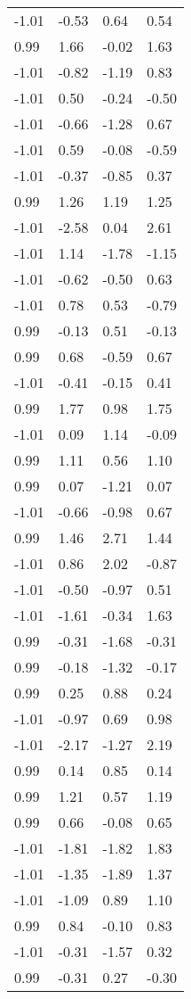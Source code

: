 \documentclass[
  doc,draftall]{apa6}
\begin{document}
\begin{table}[tbp]
\begin{center}
\begin{threeparttable}
\begin{tabular}{llll}
-1.01 & -0.53 & 0.64 & 0.54\\
0.99 & 1.66 & -0.02 & 1.63\\
-1.01 & -0.82 & -1.19 & 0.83\\
-1.01 & 0.50 & -0.24 & -0.50\\
-1.01 & -0.66 & -1.28 & 0.67\\
-1.01 & 0.59 & -0.08 & -0.59\\
-1.01 & -0.37 & -0.85 & 0.37\\
0.99 & 1.26 & 1.19 & 1.25\\
-1.01 & -2.58 & 0.04 & 2.61\\
-1.01 & 1.14 & -1.78 & -1.15\\
-1.01 & -0.62 & -0.50 & 0.63\\
-1.01 & 0.78 & 0.53 & -0.79\\
0.99 & -0.13 & 0.51 & -0.13\\
0.99 & 0.68 & -0.59 & 0.67\\
-1.01 & -0.41 & -0.15 & 0.41\\
0.99 & 1.77 & 0.98 & 1.75\\
-1.01 & 0.09 & 1.14 & -0.09\\
0.99 & 1.11 & 0.56 & 1.10\\
0.99 & 0.07 & -1.21 & 0.07\\
-1.01 & -0.66 & -0.98 & 0.67\\
0.99 & 1.46 & 2.71 & 1.44\\
-1.01 & 0.86 & 2.02 & -0.87\\
-1.01 & -0.50 & -0.97 & 0.51\\
-1.01 & -1.61 & -0.34 & 1.63\\
0.99 & -0.31 & -1.68 & -0.31\\
0.99 & -0.18 & -1.32 & -0.17\\
0.99 & 0.25 & 0.88 & 0.24\\
-1.01 & -0.97 & 0.69 & 0.98\\
-1.01 & -2.17 & -1.27 & 2.19\\
0.99 & 0.14 & 0.85 & 0.14\\
0.99 & 1.21 & 0.57 & 1.19\\
0.99 & 0.66 & -0.08 & 0.65\\
-1.01 & -1.81 & -1.82 & 1.83\\
-1.01 & -1.35 & -1.89 & 1.37\\
-1.01 & -1.09 & 0.89 & 1.10\\
0.99 & 0.84 & -0.10 & 0.83\\
-1.01 & -0.31 & -1.57 & 0.32\\
0.99 & -0.31 & 0.27 & -0.30\\

\end{tabular}
\end{threeparttable}
\end{center}
\end{table}
\end{document}
